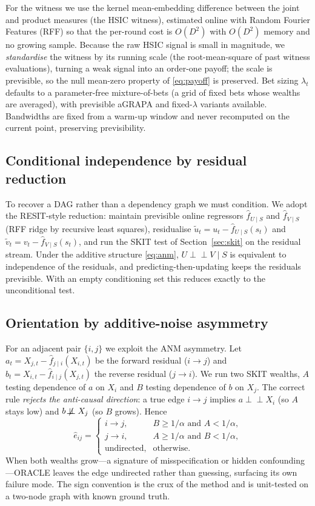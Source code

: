 \documentclass[preprint,12pt,authoryear]{elsarticle}
\begin{document}
For the witness we use the kernel mean-embedding difference between the joint
and product measures (the HSIC witness), estimated online with Random Fourier
Features (RFF) so that the per-round cost is $O(D^2)$ with $O(D^2)$ memory and no
growing sample. Because the raw HSIC signal is small in magnitude, we
\emph{standardise} the witness by its running scale (the root-mean-square of past
witness evaluations), turning a weak signal into an order-one payoff; the scale
is previsible, so the null mean-zero property of \eqref{eq:payoff} is preserved.
Bet sizing $\lambda_t$ defaults to a parameter-free mixture-of-bets (a grid of
fixed bets whose wealths are averaged), with previsible aGRAPA and fixed-$\lambda$
variants available. Bandwidths are fixed from a warm-up window and never
recomputed on the current point, preserving previsibility.

\subsection{Conditional independence by residual reduction}
\label{sec:ci}
To recover a DAG rather than a dependency graph we must condition. We adopt the
RESIT-style reduction: maintain previsible online regressors
$\hat f_{U\mid S}$ and $\hat f_{V\mid S}$ (RFF ridge by recursive least squares),
residualise $\tilde u_t = u_t - \hat f_{U\mid S}(s_t)$ and
$\tilde v_t = v_t - \hat f_{V\mid S}(s_t)$, and run the SKIT test of
Section~\ref{sec:skit} on the residual stream. Under the additive structure
\eqref{eq:anm}, $U \perp\!\!\!\perp V \mid S$ is equivalent to independence of the
residuals, and predicting-then-updating keeps the residuals previsible. With an
empty conditioning set this reduces exactly to the unconditional test.

\subsection{Orientation by additive-noise asymmetry}
\label{sec:orient}
For an adjacent pair $\{i,j\}$ we exploit the ANM asymmetry. Let
$a_t = X_{j,t} - \hat f_{j\mid i}(X_{i,t})$ be the forward residual ($i\to j$)
and $b_t = X_{i,t} - \hat f_{i\mid j}(X_{j,t})$ the reverse residual ($j\to i$).
We run two SKIT wealths, $A$ testing dependence of $a$ on $X_i$ and $B$ testing
dependence of $b$ on $X_j$. The correct rule \emph{rejects the anti-causal
direction}: a true edge $i\to j$ implies $a \perp\!\!\!\perp X_i$ (so $A$ stays
low) and $b \not\!\perp\!\!\!\perp X_j$ (so $B$ grows). Hence
\begin{equation}
\hat e_{ij} =
\begin{cases}
 i \to j, & B \ge 1/\alpha \text{ and } A < 1/\alpha,\\
 j \to i, & A \ge 1/\alpha \text{ and } B < 1/\alpha,\\
 \text{undirected}, & \text{otherwise.}
\end{cases}
\label{eq:orient}
\end{equation}
When both wealths grow---a signature of misspecification or hidden
confounding---ORACLE leaves the edge undirected rather than guessing, surfacing
its own failure mode. The sign convention is the crux of the method and is
unit-tested on a two-node graph with known ground truth.
\end{document}
